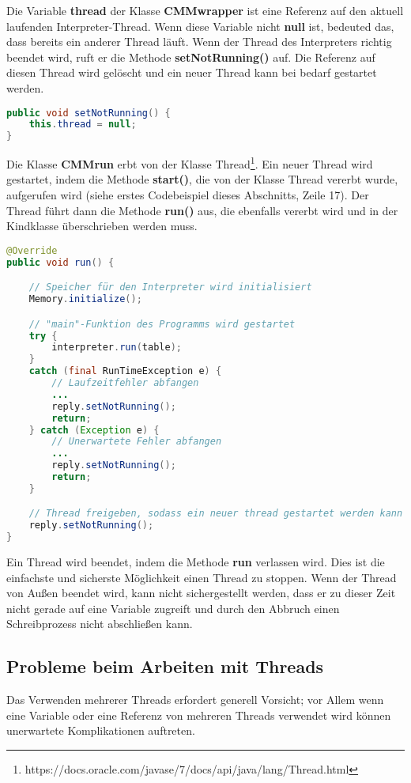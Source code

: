 Die Variable \textbf{thread} der Klasse \textbf{CMMwrapper} ist eine Referenz auf den aktuell laufenden Interpreter-Thread. Wenn diese Variable nicht \textbf{null} ist, bedeuted das, dass bereits ein anderer Thread läuft. Wenn der Thread des Interpreters richtig beendet wird, ruft er die Methode \textbf{setNotRunning()} auf. Die Referenz auf diesen Thread wird gelöscht und ein neuer Thread kann bei bedarf gestartet werden.
\begin{lstlisting}[language=JAVA]
public void setNotRunning() {
	this.thread = null;
}
\end{lstlisting}

Die Klasse \textbf{CMMrun} erbt von der Klasse Thread\footnote{https://docs.oracle.com/javase/7/docs/api/java/lang/Thread.html}. Ein neuer Thread wird gestartet, indem die Methode \textbf{start()}, die von der Klasse Thread vererbt wurde, aufgerufen wird (siehe erstes Codebeispiel dieses Abschnitts, Zeile 17). Der Thread führt dann die Methode \textbf{run()} aus, die ebenfalls vererbt wird und in der Kindklasse überschrieben werden muss.
\begin{lstlisting}[language=JAVA]
@Override
public void run() {

	// Speicher für den Interpreter wird initialisiert
	Memory.initialize();

	// "main"-Funktion des Programms wird gestartet
	try {
		interpreter.run(table);
	}
	catch (final RunTimeException e) {
		// Laufzeitfehler abfangen
		... 
		reply.setNotRunning();
		return;
	} catch (Exception e) {
		// Unerwartete Fehler abfangen
		...
		reply.setNotRunning();
		return;
	}

	// Thread freigeben, sodass ein neuer thread gestartet werden kann
	reply.setNotRunning();
}
\end{lstlisting}

Ein Thread wird beendet, indem die Methode \textbf{run} verlassen wird. Dies ist die einfachste und sicherste Möglichkeit einen Thread zu stoppen. Wenn der Thread von Außen beendet wird, kann nicht sichergestellt werden, dass er zu dieser Zeit nicht gerade auf eine Variable zugreift und durch den Abbruch einen Schreibprozess nicht abschließen kann.

\subsection{Probleme beim Arbeiten mit Threads}
\label{sec:deb-impl-thread-problems}
Das Verwenden mehrerer Threads erfordert generell Vorsicht; vor Allem wenn eine Variable oder eine Referenz von mehreren Threads verwendet wird können unerwartete Komplikationen auftreten.

